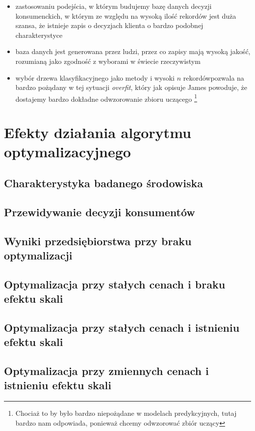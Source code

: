 \documentclass{article}
\begin{document}
	\begin{itemize}
		\item zastosowaniu podejścia, w którym budujemy bazę danych decyzji konsumenckich, w którym ze względu na wysoką ilość rekordów jest duża szansa, że istnieje zapis o decyzjach klienta o bardzo podobnej charakterystyce
		\item baza danych jest generowana przez ludzi, przez co zapisy mają wysoką jakość, rozumianą jako zgodność z wyborami w świecie rzeczywistym
		\item wybór drzewa klasyfikacyjnego  jako metody i wysoki $n$ rekordówpozwala na bardzo pożądany w tej sytuacji \textit{overfit}, który jak opisuje James powoduje, że dostajemy bardzo dokładne odwzorowanie zbioru uczącego \footnote{Chociaż to by było bardzo niepożądane w modelach predykcyjnych, tutaj bardzo nam odpowiada, ponieważ chcemy odwzorować zbiór uczący} 
	\end{itemize}


\newpage
\section{Efekty działania algorytmu optymalizacyjnego}
\subsection{Charakterystyka badanego środowiska}
\subsection{Przewidywanie decyzji konsumentów}
\subsection{Wyniki przedsiębiorstwa przy braku optymalizacji}
\subsection{Optymalizacja przy stałych cenach i braku efektu skali}
\subsection{Optymalizacja przy stałych cenach i istnieniu efektu skali}
\subsection{Optymalizacja przy zmiennych cenach i istnieniu efektu skali}



\end{document}
